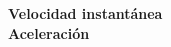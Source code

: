 \documentclass[../main]{subfiles}
\begin{document}
\textbf{Velocidad instantánea}\\

\textbf{Aceleración}\\
\end{document}
